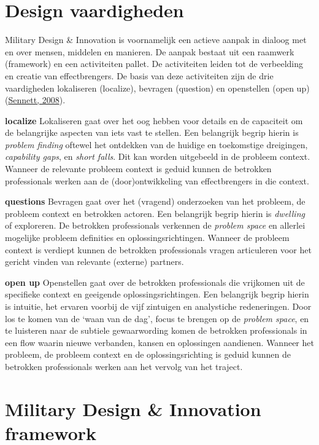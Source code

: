 \documentclass[
]{book}
\begin{document}
\hypertarget{design-vaardigheden}{%
\section{Design vaardigheden}\label{design-vaardigheden}}

Military Design \& Innovation is voornamelijk een actieve aanpak in dialoog met en over mensen, middelen en manieren. De aanpak bestaat uit een raamwerk (framework) en een activiteiten pallet. De activiteiten leiden tot de verbeelding en creatie van effectbrengers. De basis van deze activiteiten zijn de drie vaardigheden lokaliseren (localize), bevragen (question) en openstellen (open up) (\protect\hyperlink{ref-sennett_craftsman_2008}{Sennett, 2008}).

\textbf{localize}
Lokaliseren gaat over het oog hebben voor details en de capaciteit om de belangrijke aspecten van iets vast te stellen. Een belangrijk begrip hierin is \emph{problem finding} oftewel het ontdekken van de huidige en toekomstige dreigingen, \emph{capability gaps}, en \emph{short falls}. Dit kan worden uitgebeeld in de probleem context. Wanneer de relevante probleem context is geduid kunnen de betrokken professionals werken aan de (door)ontwikkeling van effectbrengers in die context.

\textbf{questions}
Bevragen gaat over het (vragend) onderzoeken van het probleem, de probleem context en betrokken actoren. Een belangrijk begrip hierin is \emph{dwelling} of exploreren. De betrokken professionals verkennen de \emph{problem space} en allerlei mogelijke probleem definities en oplossingsrichtingen. Wanneer de probleem context is verdiept kunnen de betrokken professionals vragen articuleren voor het gericht vinden van relevante (externe) partners.

\textbf{open up}
Openstellen gaat over de betrokken professionals die vrijkomen uit de specifieke context en geeigende oplossingsrichtingen. Een belangrijk begrip hierin is intuitie, het ervaren voorbij de vijf zintuigen en analystiche redeneringen. Door los te komen van de `waan van de dag', focus te brengen op de \emph{problem space}, en te luisteren naar de subtiele gewaarwording komen de betrokken professionals in een flow waarin nieuwe verbanden, kansen en oplossingen aandienen. Wanneer het probleem, de probleem context en de oplossingsrichting is geduid kunnen de betrokken professionals werken aan het vervolg van het traject.

\hypertarget{military-design-innovation-framework}{%
\section{Military Design \& Innovation framework}\label{military-design-innovation-framework}}
\end{document}
